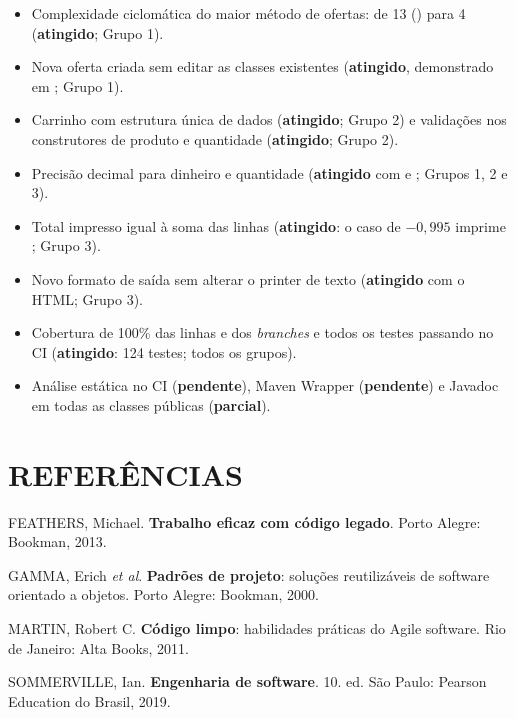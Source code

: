 \begin{itemize}
\item Complexidade ciclomática do maior método de ofertas: de 13 () para 4 (\textbf{atingido}; Grupo 1).
\item Nova oferta criada sem editar as classes existentes (\textbf{atingido}, demonstrado em ; Grupo 1).
\item Carrinho com estrutura única de dados (\textbf{atingido}; Grupo 2) e validações nos construtores de produto e quantidade (\textbf{atingido}; Grupo 2).
\item Precisão decimal para dinheiro e quantidade (\textbf{atingido} com  e ; Grupos 1, 2 e 3).
\item Total impresso igual à soma das linhas (\textbf{atingido}: o caso de $-0{,}995$ imprime ; Grupo 3).
\item Novo formato de saída sem alterar o printer de texto (\textbf{atingido} com o HTML; Grupo 3).
\item Cobertura de 100\% das linhas e dos \textit{branches} e todos os testes passando no CI (\textbf{atingido}: 124 testes; todos os grupos).
\item Análise estática no CI (\textbf{pendente}), Maven Wrapper (\textbf{pendente}) e Javadoc em todas as classes públicas (\textbf{parcial}).
\end{itemize}

\newpage
\section*{REFERÊNCIAS}
\begin{singlespace}\raggedright\noindent
FEATHERS, Michael. \textbf{Trabalho eficaz com código legado}. Porto Alegre: Bookman, 2013.

\vspace{12pt}\noindent GAMMA, Erich \textit{et al}. \textbf{Padrões de projeto}: soluções reutilizáveis de software orientado a objetos. Porto Alegre: Bookman, 2000.

\vspace{12pt}\noindent MARTIN, Robert C. \textbf{Código limpo}: habilidades práticas do Agile software. Rio de Janeiro: Alta Books, 2011.

\vspace{12pt}\noindent SOMMERVILLE, Ian. \textbf{Engenharia de software}. 10. ed. São Paulo: Pearson Education do Brasil, 2019.
\end{singlespace}

